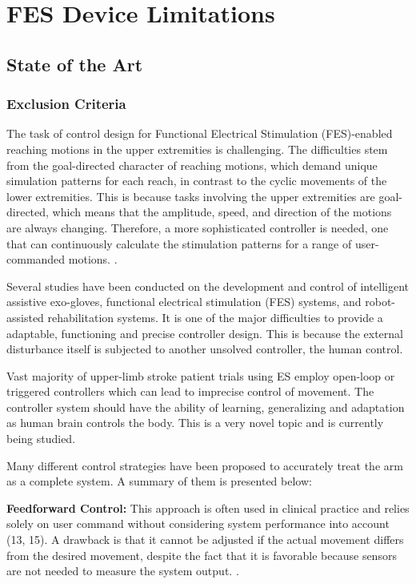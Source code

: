 \section{FES Device Limitations}
\subsection{State of the Art}
\subsubsection{Exclusion Criteria}
The task of control design for Functional Electrical Stimulation (FES)-enabled reaching motions in the upper extremities is challenging. The difficulties stem from the goal-directed character of reaching motions, which demand unique simulation patterns for each reach, in contrast to the cyclic movements of the lower extremities. This is because tasks involving the upper extremities are goal-directed, which means that the amplitude, speed, and direction of the motions are always changing. Therefore, a more sophisticated controller is needed, one that can continuously calculate the stimulation patterns for a range of user-commanded motions. \cite{CFF}.

Several studies have been conducted on the development and control of intelligent assistive exo-gloves, functional electrical stimulation (FES) systems, and robot-assisted rehabilitation systems. It is one of the major difficulties to provide a adaptable, functioning and precise controller design. This is because the external disturbance itself is subjected to another unsolved controller, the human control. 

Vast majority of upper-limb stroke patient trials using ES employ open-loop or triggered controllers which can lead to imprecise control of movement. The controller system should have the ability of learning, generalizing and adaptation as human brain controls the body. This is a very novel topic and is currently being studied.

Many different control strategies have been proposed to accurately treat the arm as a complete system. A summary of them is presented below:

\textbf{Feedforward Control:} This approach is often used in clinical practice and relies solely on user command without considering system performance into account (13, 15). A drawback is that it cannot be adjusted if the actual movement differs from the desired movement, despite the fact that it is favorable because sensors are not needed to measure the system output.  \cite{CFF}.

